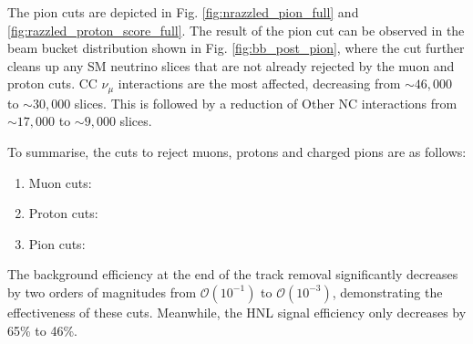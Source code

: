 The pion cuts are depicted in Fig. \ref{fig:nrazzled_pion_full} and \ref{fig:razzled_proton_score_full}. 
The result of the pion cut can be observed in the beam bucket distribution shown in Fig. \ref{fig:bb_post_pion}, where the cut further cleans up any SM neutrino slices that are not already rejected by the muon and proton cuts.  
CC $\nu_\mu$ interactions are the most affected, decreasing from $\sim46,000$ to $\sim30,000$ slices.
This is followed by a reduction of Other NC interactions from $\sim17,000$ to $\sim9,000$ slices.

To summarise, the cuts to reject muons, protons and charged pions are as follows:
\begin{enumerate}
\item Muon cuts:
\item Proton cuts:
\item Pion cuts:
\end{enumerate}
The background efficiency at the end of the track removal significantly decreases by two orders of magnitudes from $\mathcal{O}(10^{-1})$ to $\mathcal{O}(10^{-3})$, demonstrating the effectiveness of these cuts.
Meanwhile, the HNL signal efficiency only decreases by 65\% to 46\%.

